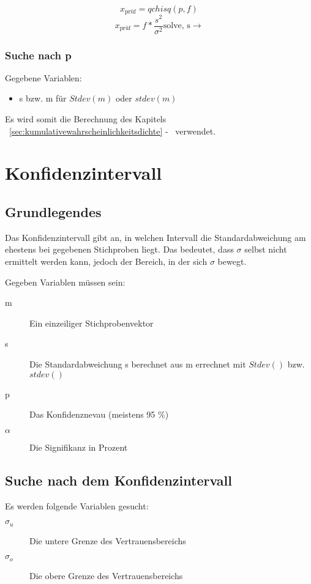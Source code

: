 \documentclass[a4paper,10pt]{article}
\begin{document}
\begin{equation}
  x_{\text{prüf}} = qchisq(p, f)
\end{equation}
\begin{equation}
  x_{\text{prüf}} = f * \frac{s^2}{\sigma^2} \text{solve, s} \rightarrow
\end{equation}

\subsubsection{Suche nach p}
\label{sec:chisuchenachp}
Gegebene Variablen:
\begin{itemize}
\item s bzw. m für $ Stdev(m) $ oder $ stdev(m) $
\end{itemize}

Es wird somit die Berechnung des Kapitels
~\autoref{sec:kumulativewahrscheinlichkeitsdichte}
-~
verwendet.

\section{Konfidenzintervall}
\label{sec:konfidenzintervall}
\subsection{Grundlegendes}
Das Konfidenzintervall gibt an, in welchen Intervall die Standardabweichung am
ehestens bei gegebenen Stichproben liegt. Das bedeutet, dass $ \sigma $ selbst
nicht ermittelt werden kann, jedoch der Bereich, in der sich $ \sigma $ bewegt.

Gegeben Variablen müssen sein:
\begin{description}
\item[m] Ein einzeiliger Stichprobenvektor
\item[s] Die Standardabweichung s berechnet aus m errechnet mit $
  Stdev() $ bzw. $ stdev() $
\item[p] Das Konfidenznevau (meistens 95 \%)
\item[$ \alpha $] Die Signifikanz in Prozent
\end{description}

\subsection{Suche nach dem Konfidenzintervall}
Es werden folgende Variablen gesucht:
\begin{description}
\item[$ \sigma_u $] Die untere Grenze des Vertrauensbereichs
\item[$ \sigma_o $] Die obere Grenze des Vertrauensbereichs
\end{description}
\end{document}
